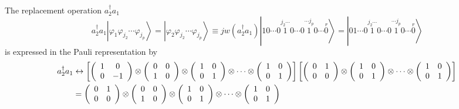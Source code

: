 \documentclass[aps,preprint]{revtex4}%
\begin{document}
The replacement operation $a_{2}^{\dagger}a_{1}$
\begin{equation}
a_{2}^{\dagger}a_{1}\left\vert \varphi_{1}\varphi_{j_{2}}\cdots\varphi_{j_{p}%
}\right\rangle =\left\vert \varphi_{2}\varphi_{j_{2}}\cdots\varphi_{j_{p}%
}\right\rangle \equiv jw\left(  a_{2}^{\dagger}a_{1}\right)  \left\vert
10\cdots0\overset{j_{2}\cdots}{1}0\cdots0\overset{\cdots j_{p}}{1}%
0\cdots\overset{r}{0}\right\rangle =\left\vert 01\cdots0\overset{j_{2}%
\cdots}{1}0\cdots0\overset{\cdots j_{p}}{1}0\cdots\overset{r}{0}\right\rangle
\end{equation}
is expressed in the Pauli representation by
\begin{align}
a_{2}^{\dagger}a_{1}  &  \leftrightarrow\left[  \left(
\begin{array}
[c]{cc}%
1 & 0\\
0 & -1
\end{array}
\right)  \otimes\left(
\begin{array}
[c]{cc}%
0 & 0\\
1 & 0
\end{array}
\right)  \otimes\left(
\begin{array}
[c]{cc}%
1 & 0\\
0 & 1
\end{array}
\right)  \otimes\cdots\otimes\left(
\begin{array}
[c]{cc}%
1 & 0\\
0 & 1
\end{array}
\right)  \right]  \left[  \left(
\begin{array}
[c]{cc}%
0 & 1\\
0 & 0
\end{array}
\right)  \otimes\left(
\begin{array}
[c]{cc}%
1 & 0\\
0 & 1
\end{array}
\right)  \otimes\cdots\otimes\left(
\begin{array}
[c]{cc}%
1 & 0\\
0 & 1
\end{array}
\right)  \right] \\
&  =\left(
\begin{array}
[c]{cc}%
0 & 1\\
0 & 0
\end{array}
\right)  \otimes\left(
\begin{array}
[c]{cc}%
0 & 0\\
1 & 0
\end{array}
\right)  \otimes\left(
\begin{array}
[c]{cc}%
1 & 0\\
0 & 1
\end{array}
\right)  \otimes\cdots\otimes\left(
\begin{array}
[c]{cc}%
1 & 0\\
0 & 1
\end{array}
\right)
\end{align}
\end{document}
